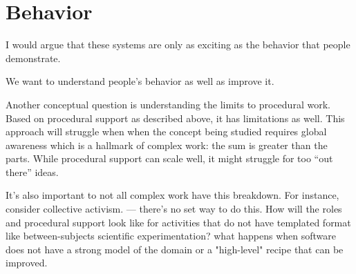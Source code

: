 








\section{Behavior} 

I would argue that these systems are only as exciting as the behavior that people demonstrate. 

We want to understand people's behavior as well as improve it. 

Another conceptual question is understanding the limits to procedural work. Based on procedural support as described above, it has limitations as well. This approach will struggle when when the concept being studied requires global awareness which is a hallmark of complex work: the sum is greater than the parts.  While procedural support can scale well, it might struggle for too “out there” ideas.

It's also important to not all complex work have this breakdown. For instance, consider collective activism. — there’s no set way to do this. How will the roles and procedural support look like for activities that do not have templated format like between-subjects scientific experimentation?  what happens when software does not have a strong model of the domain or a "high-level" recipe that can be improved.



